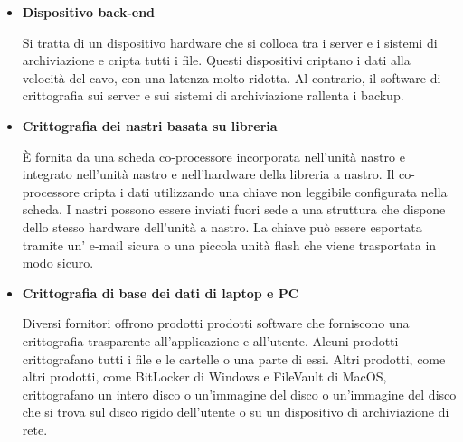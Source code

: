\begin{itemize}
    \item \textbf{Dispositivo back-end}
    
    Si tratta di un dispositivo hardware che si colloca tra i server e i sistemi di archiviazione e cripta tutti i file. Questi dispositivi criptano i dati alla velocità del cavo, con una latenza molto ridotta. Al contrario, il software di crittografia sui server e sui sistemi di archiviazione rallenta i backup. 
    
    \item \textbf{Crittografia dei nastri basata su libreria}
    
    È fornita da una scheda co-processore incorporata nell'unità nastro e integrato nell'unità nastro e nell'hardware della libreria a nastro. Il co-processore cripta i dati utilizzando una chiave non leggibile configurata nella scheda. I nastri possono essere inviati fuori sede a una struttura che dispone dello stesso hardware dell'unità a nastro. La chiave può essere esportata tramite un' e-mail sicura o una piccola unità flash che viene trasportata in modo sicuro. 
    
    \item \textbf{Crittografia di base dei dati di laptop e PC}
    
    Diversi fornitori offrono prodotti prodotti software che forniscono una crittografia trasparente all'applicazione e all'utente. Alcuni prodotti crittografano tutti i file e le cartelle o una parte di essi. Altri prodotti, come altri prodotti, come BitLocker di Windows e FileVault di MacOS, crittografano un intero disco o un'immagine del disco o un'immagine del disco che si trova sul disco rigido dell'utente o su un dispositivo di archiviazione di rete.
\end{itemize}
